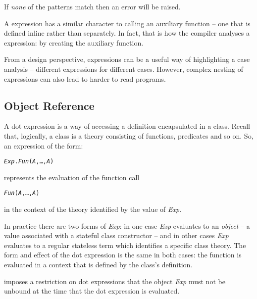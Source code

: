 If \emph{none} of the patterns match then an error will be raised.

A  expression has a similar character to calling an auxiliary function -- one that is defined inline rather than separately. In fact, that is how the compiler analyses a  expression: by creating the auxiliary function.

\begin{aside}
From a design perspective,  expressions can be a useful way of highlighting a case analysis -- different expressions for different cases. However, complex nesting of expressions can also lead to harder to read programs.
\end{aside}

\subsection{Object Reference}
\label{expression:dot}

A dot expression is a way of accessing a definition encapsulated in a class. Recall that, logically, a class is a theory consisting of functions, predicates and so on. So, an expression of the form:
\begin{alltt}
\emph{Exp}.\emph{Fun}(\emph{A},\ldots,\emph{A\subn})
\end{alltt}
represents the evaluation of the function call
\begin{alltt}
\emph{Fun}(\emph{A},\ldots,\emph{A\subn})
\end{alltt}
in the context of the theory identified by the value of \emph{Exp}.

In practice there are two forms of \emph{Exp}: in one case \emph{Exp} evaluates to an \emph{object} -- a value associated with a stateful class constructor -- and in other cases \emph{Exp} evaluates to a regular stateless term which identifies a specific class theory. The form and effect of the dot expression is the same in both cases: the function is evaluated in a context that is defined by the class's definition.

\go imposes a restriction on dot expressions that the object \emph{Exp} must not be unbound at the time that the dot expression is evaluated.

